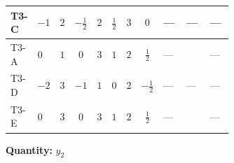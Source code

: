 \documentclass[8pt]{article}
\begin{document}
\begin{landscape}
\begin{longtable}{@{}llcccccc >{\raggedright\arraybackslash}p{0.21\linewidth} >{\raggedright\arraybackslash}p{0.21\linewidth} >{\raggedright\arraybackslash}p{0.21\linewidth}@{}}
\midrule
T3-C & $-1$ & $2$ & $-\frac{1}{2}$ & $2$ & $\frac{1}{2}$ & $3$ & $0$ & --- & --- & --- \\
\midrule
T3-A & $0$ & $1$ & $0$ & $3$ & $1$ & $2$ & $\frac{1}{2}$ & --- & \scriptsize\adjustbox{max width=\linewidth}{$\begin{gathered} T_{\nu}^{(2)} \left({y_2}\right)_{ij}\end{gathered}$} & --- \\
\midrule
T3-D & $-2$ & $3$ & $-1$ & $1$ & $0$ & $2$ & $-\frac{1}{2}$ & --- & --- & --- \\
\midrule
T3-E & $0$ & $3$ & $0$ & $3$ & $1$ & $2$ & $\frac{1}{2}$ & --- & \scriptsize\adjustbox{max width=\linewidth}{$\begin{gathered} T_{\nu}^{(2)} \left({y_2}\right)_{ij}\end{gathered}$} & --- \\
\midrule
\bottomrule
\end{longtable}
\clearpage
\noindent\textbf{Quantity: }$y_2$\par\smallskip

\end{landscape}
\end{document}
